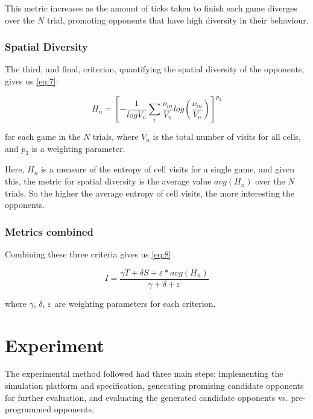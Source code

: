 This metric increases as the amount of ticks taken to finish each game diverges
over the \(N\) trial, promoting opponents that have high diversity in their behaviour.

\subsubsection{Spatial Diversity}
\label{sec:spatial-diversity}

The third, and final, criterion, quantifying the spatial diversity of the
opponents, gives us \eqref{eq:7}:

\begin{equation}
  \label{eq:7}
  H_n = \left[ -\frac{1}{log V_n} \sum_i \frac{\nu_{in}}{V_n}
    log\left(\frac{\nu_{in}}{V_n}\right) \right]^{p_3}
\end{equation}

for each game in the \(N\) trials, where \(V_n\) is the total number of visits
for all cells, and \(p_3\) is a weighting parameter.

Here, \(H_n\) is a measure of the entropy of cell visits for a single game, and
given this, the metric for spatial diversity is the average value \(avg(H_n)\)
over the \(N\) trials. So the higher the average entropy of cell visits, the
more interesting the opponents.

\subsubsection{Metrics combined}
\label{sec:metrics-combined}

Combining these three criteria gives us \eqref{eq:8}

\begin{equation}
  \label{eq:8}
  I =\frac{\gamma T + \delta S + \varepsilon * avg(H_n)}{\gamma + \delta + \varepsilon}
\end{equation}

where \(\gamma\), \(\delta\), \(\varepsilon\) are weighting parameters for each
criterion.


\section{Experiment}
\label{sec:experiment}

 The experimental
method followed had three main steps: implementing the simulation platform and
specification, generating promising candidate opponents for further evaluation,
and evaluating the generated candidate opponents vs. pre-programmed opponents.

